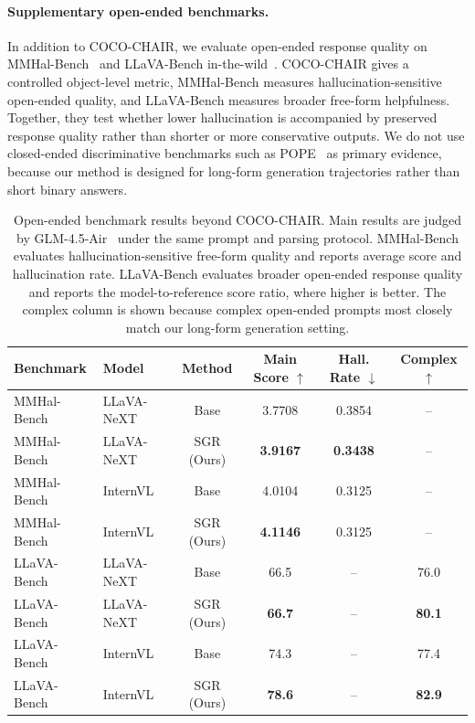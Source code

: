 \documentclass[11pt]{article}
\begin{document}
  \paragraph{Supplementary open-ended benchmarks.}
  In addition to COCO-CHAIR, we evaluate open-ended response quality on MMHal-Bench~\citep{sun-etal-2024-aligning} and LLaVA-Bench in-the-wild~\citep{liu-etal-2023-visual-instruction}.
  COCO-CHAIR gives a controlled object-level metric, MMHal-Bench measures hallucination-sensitive open-ended quality, and LLaVA-Bench measures broader free-form helpfulness.
  Together, they test whether lower hallucination is accompanied by preserved response quality rather than shorter or more conservative outputs.
  We do not use closed-ended discriminative benchmarks such as POPE~\citep{li-etal-2023-evaluating} as primary evidence, because our method is designed for long-form generation trajectories rather than short binary answers.

  \begin{table}[!t]
    \centering
    \small
    \begin{tabular}{llcccc}
    \hline
    Benchmark & Model & Method & Main Score $\uparrow$ & Hall. Rate $\downarrow$ & Complex $\uparrow$ \\
    \hline
    MMHal-Bench & LLaVA-NeXT & Base & 3.7708 & 0.3854 & -- \\
    MMHal-Bench & LLaVA-NeXT & SGR (Ours) & \textbf{3.9167} & \textbf{0.3438} & -- \\
    MMHal-Bench & InternVL & Base & 4.0104 & 0.3125 & -- \\
    MMHal-Bench & InternVL & SGR (Ours) & \textbf{4.1146} & 0.3125 & -- \\
    \hline
    LLaVA-Bench & LLaVA-NeXT & Base & 66.5 & -- & 76.0 \\
    LLaVA-Bench & LLaVA-NeXT & SGR (Ours) & \textbf{66.7} & -- & \textbf{80.1} \\
    LLaVA-Bench & InternVL & Base & 74.3 & -- & 77.4 \\
    LLaVA-Bench & InternVL & SGR (Ours) & \textbf{78.6} & -- & \textbf{82.9} \\
    \hline
    \end{tabular}
    \caption{
    Open-ended benchmark results beyond COCO-CHAIR.
    Main results are judged by GLM-4.5-Air~\citep{glm45arc2025} under the same prompt and parsing protocol.
    MMHal-Bench evaluates hallucination-sensitive free-form quality and reports average score and hallucination rate.
    LLaVA-Bench evaluates broader open-ended response quality and reports the model-to-reference score ratio, where higher is better.
    The complex column is shown because complex open-ended prompts most closely match our long-form generation setting.
    }
    \label{tab:open_ended}
  \end{table}
\end{document}

